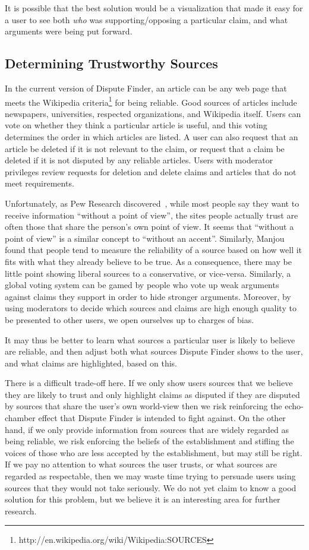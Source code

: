 \documentclass{www2010-submission}
\begin{document}
It is possible that the best solution would be a visualization that made it easy for a user to see both {\it who} was supporting/opposing a particular claim, and what arguments were being put forward.


\subsection{Determining Trustworthy Sources}

In the current version of Dispute Finder, an article can be any web page that meets the Wikipedia criteria\footnote{http://en.wikipedia.org/wiki/Wikipedia:SOURCES} for being reliable. Good sources of articles include newspapers, universities, respected organizations, and Wikipedia itself. Users can vote on whether they think a particular article is useful, and this voting determines the order in which articles are listed. A user can also request that an article be deleted if it is not relevant to the claim, or request that a claim be deleted if it is not disputed by any reliable articles. Users with moderator privileges review requests for deletion and delete claims and articles that do not meet requirements.

Unfortunately, as Pew Research discovered~\cite{PewResearch2008}, while most people say they want to receive information ``without a point of view'', the sites people actually trust are often those that share the person's own point of view. It seems that ``without a point of view'' is a similar concept to ``without an accent''. Similarly, Manjou~\cite{Manjou2008} found that people tend to measure the reliability of a source based on how well it fits with what they already believe to be true.  As a consequence, there may be little point showing liberal sources to a conservative, or vice-versa. Similarly, a global voting system can be gamed by people who vote up weak arguments against claims they support in order to hide stronger arguments. Moreover, by using moderators to decide which sources and claims are high enough quality to be presented to other users, we open ourselves up to charges of bias.

It may thus be better to learn what sources a particular user is likely to believe are reliable, and then adjust both what sources Dispute Finder shows to the user, and what claims are highlighted, based on this.

There is a difficult trade-off here. If we only show users sources that we believe they are likely to trust and only highlight claims as disputed if they are disputed by sources that share the user's own world-view then we risk reinforcing the echo-chamber effect that Dispute Finder is intended to fight against. On the other hand, if we only provide information from sources that are widely regarded as being reliable, we risk enforcing the beliefs of the establishment and stifling the voices of those who are less accepted by the establishment, but may still be right. If we pay no attention to what sources the user trusts, or what sources are regarded as respectable, then we may waste time trying to persuade users using sources that they would not take seriously. We do not yet claim to know a good solution for this problem, but we believe it is an interesting area for further research.
\end{document}
